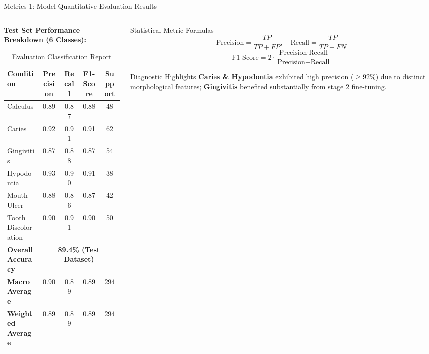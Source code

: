 \documentclass[aspectratio=169, 10pt]{beamer}
\begin{document}
\begin{frame}{Metrics 1: Model Quantitative Evaluation Results}
\begin{columns}[T]
    \begin{column}{0.58\textwidth}
        \textbf{Test Set Performance Breakdown (6 Classes):}
        \begin{table}[H]
        \centering
        \scriptsize
        \begin{tabular}{@{}lcccc@{}}
        \toprule
        \textbf{Condition} & \textbf{Precision} & \textbf{Recall} & \textbf{F1-Score} & \textbf{Support} \\ \midrule
        Calculus & 0.89 & 0.87 & 0.88 & 48 \\
        Caries & 0.92 & 0.91 & 0.91 & 62 \\
        Gingivitis & 0.87 & 0.88 & 0.87 & 54 \\
        Hypodontia & 0.93 & 0.90 & 0.91 & 38 \\
        Mouth Ulcer & 0.88 & 0.86 & 0.87 & 42 \\
        Tooth Discoloration & 0.90 & 0.91 & 0.90 & 50 \\ \midrule
        \textbf{Overall Accuracy} & \multicolumn{4}{c}{\textbf{89.4\% (Test Dataset)}} \\
        \textbf{Macro Average} & 0.90 & 0.89 & 0.89 & 294 \\
        \textbf{Weighted Average} & 0.89 & 0.89 & 0.89 & 294 \\ \bottomrule
        \end{tabular}
        \caption{Evaluation Classification Report}
        \end{table}
    \end{column}
    \begin{column}{0.42\textwidth}
        \begin{block}{Statistical Metric Formulas}
            \scriptsize
            \begin{equation*}
                \text{Precision} = \frac{TP}{TP + FP}, \quad \text{Recall} = \frac{TP}{TP + FN}
            \end{equation*}
            \begin{equation*}
                \text{F1-Score} = 2 \cdot \frac{\text{Precision} \cdot \text{Recall}}{\text{Precision} + \text{Recall}}
            \end{equation*}
        \end{block}
        \begin{exampleblock}{Diagnostic Highlights}
            \scriptsize \textbf{Caries \& Hypodontia} exhibited high precision ($\ge 92\%$) due to distinct morphological features; \textbf{Gingivitis} benefited substantially from stage 2 fine-tuning.
        \end{exampleblock}
    \end{column}
\end{columns}
\end{frame}
\end{document}
